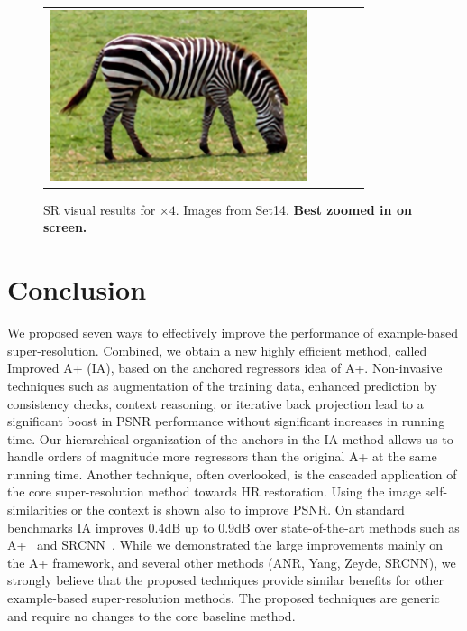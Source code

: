 \documentclass[10pt,twocolumn,letterpaper]{article}
\begin{document}
\begin{figure}[]
{\begin{tabular}{ccccc}
\includegraphics[height=5cm]{RGB4x/zebra10-OurIA.png}\\[4pt]
\end{tabular}
}
\caption{SR visual results for $\times4$. Images from Set14. \textbf{Best zoomed in on screen.}}
\label{fig:visual_results}
\vspace{0.5cm}
\end{figure}

\section{Conclusion}
\label{sec:conclusion}

We proposed seven ways to effectively improve the performance of example-based super-resolution. Combined, we obtain a new highly efficient method, called Improved A+ (IA), based on the anchored regressors idea of A+.
Non-invasive techniques such as augmentation of the training data, enhanced prediction by consistency checks, context reasoning, or iterative back projection lead to a significant boost in PSNR performance without significant increases in running time.
Our hierarchical organization of the anchors in the IA method allows us to handle orders of magnitude more regressors than the original A+ at the same running time.
Another technique, often overlooked, is the cascaded application of the core super-resolution method towards HR restoration. Using the image self-similarities or the context is shown also to improve PSNR.
On standard benchmarks IA improves 0.4dB up to 0.9dB over state-of-the-art methods such as A+~\cite{Timofte-ACCV-2014} and SRCNN~\cite{Dong-ECCV-2014}. 
While we demonstrated the large improvements mainly on the A+ framework, and several other methods (ANR, Yang, Zeyde, SRCNN), we strongly believe that the proposed techniques provide similar benefits for other example-based super-resolution methods. The proposed techniques are generic and require no changes to the core baseline method. 

\newpage
{
\small


}
\end{document}
